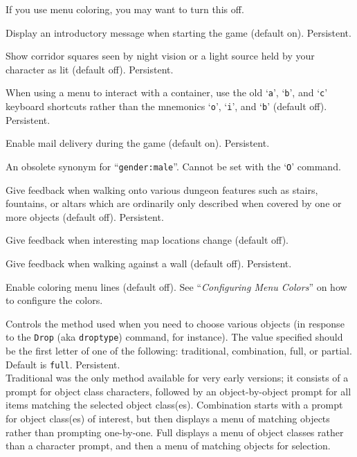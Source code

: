 \documentclass[titlepage]{article}
\begin{document}
\begin{description}[font=\mdseries\itshape]
If you use menu coloring, you may want to turn this off.
\item[legacy]
Display an introductory message when starting the game (default on).
Persistent.
\item[lit\textunderscore corridor]
Show corridor squares seen by night vision or a light source held by your
character as lit (default off).  Persistent.
\item[lootabc]
When using a menu to interact with a container,
use the old `\texttt{a}', `\texttt{b}', and `\texttt{c}' keyboard shortcuts
rather than the mnemonics `\texttt{o}', `\texttt{i}', and `\texttt{b}' (default off).
Persistent.
\item[mail]
Enable mail delivery during the game (default on).  Persistent.
\item[male]
An obsolete synonym for ``\texttt{gender:male}''.  Cannot be set with the
`\texttt{O}' command.
\item[mention\textunderscore decor]
Give feedback when walking onto various dungeon features such as stairs,
fountains, or altars which are ordinarily only described when covered
by one or more objects (default off).  Persistent.
\item[mention\textunderscore map]
Give feedback when interesting map locations change (default off).
\item[mention\textunderscore walls]
Give feedback when walking against a wall (default off).  Persistent.
\item[menucolors]
Enable coloring menu lines (default off).
See ``\textit{Configuring Menu Colors}'' on how to configure the colors.
\item[menustyle]
Controls the method used when you need to choose various objects (in
response to the \texttt{Drop} (aka \texttt{droptype}) command, for instance).
The value specified should be the first letter of one of the following:
traditional, combination, full, or partial.
Default is \texttt{full}.
Persistent.
\\
Traditional was the only method available for very
early versions; it consists of a prompt for object class characters,
followed by an object-by-object prompt for all items matching the selected
object class(es).
Combination starts with a prompt for object class(es)
of interest, but then displays a menu of matching objects rather than
prompting one-by-one.
Full displays a menu of
object classes rather than a character prompt, and then a menu of matching
objects for selection.

\end{description}
\end{document}
